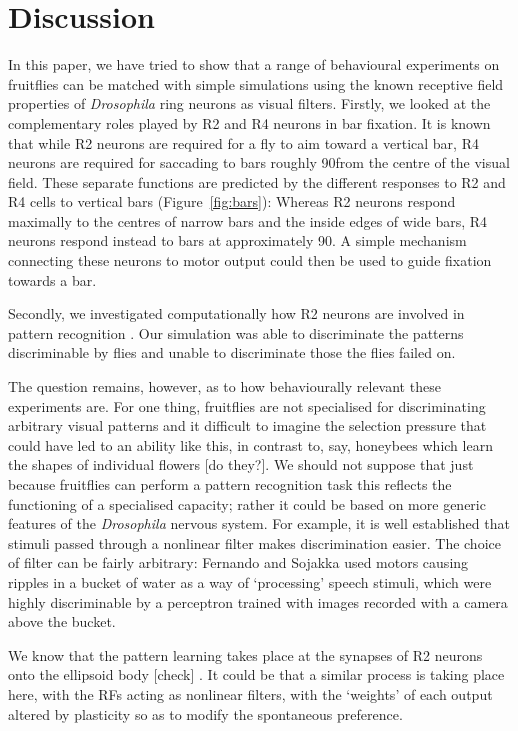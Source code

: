 \section*{Discussion}
In this paper, we have tried to show that a range of behavioural experiments on fruitflies can be matched with simple simulations using the known receptive field properties of \emph{Drosophila} ring neurons as visual filters.
Firstly, we looked at the complementary roles played by R2 and R4 neurons in bar fixation.
It is known that while R2 neurons are required for a fly to aim toward a vertical bar, R4 neurons are required for saccading to bars roughly 90\degree from the centre of the visual field.
These separate functions are predicted by the different responses to R2 and R4 cells to vertical bars (Figure~\ref{fig:bars}): Whereas R2 neurons respond maximally to the centres of narrow bars and the inside edges of wide bars, R4 neurons respond instead to bars at approximately 90\degree.
A simple mechanism connecting these neurons to motor output could then be used to guide fixation towards a bar.

Secondly, we investigated computationally how R2 neurons are involved in pattern recognition \cite{Ernst1999,Pan2009,Liu2006}.
Our simulation was able to discriminate the patterns discriminable by flies and unable to discriminate those the flies failed on.

The question remains, however, as to how behaviourally relevant these experiments are.
For one thing, fruitflies are not specialised for discriminating arbitrary visual patterns and it difficult to imagine the selection pressure that could have led to an ability like this, in contrast to, say, honeybees which learn the shapes of individual flowers [do they?].
We should not suppose that just because fruitflies can perform a pattern recognition task this reflects the functioning of a specialised capacity; rather it could be based on more generic features of the \emph{Drosophila} nervous system.
For example, it is well established that stimuli passed through a nonlinear filter makes discrimination easier.
The choice of filter can be fairly arbitrary: Fernando and Sojakka \cite{Fernando2003} used motors causing ripples in a bucket of water as a way of `processing' speech stimuli, which were highly discriminable by a perceptron trained with images recorded with a camera above the bucket.

We know that the pattern learning takes place at the synapses of R2 neurons onto the ellipsoid body [check] \cite{Pan2009}.
It could be that a similar process is taking place here, with the \acp{RF} acting as nonlinear filters, with the `weights' of each output altered by plasticity so as to modify the spontaneous preference.

